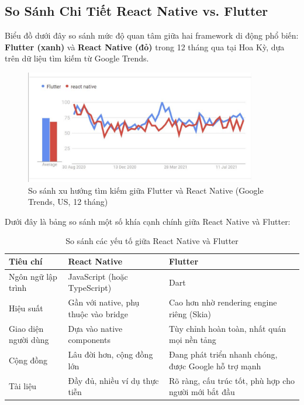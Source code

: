 \subsection{So Sánh Chi Tiết React Native vs. Flutter}
\renewcommand{\labelitemi}{--}    
\begin{flushleft}
    \hspace*{0.8cm}Biểu đồ dưới đây so sánh mức độ quan tâm giữa hai framework di động phổ biến: \textbf{Flutter (xanh)} và \textbf{React Native (đỏ)} trong 12 tháng qua tại Hoa Kỳ, dựa trên dữ liệu tìm kiếm từ Google Trends.

    \begin{figure}[H]
        \centering
        \includegraphics[width=0.9\textwidth]{images/reactNative_flutter.png}
        \caption{So sánh xu hướng tìm kiếm giữa Flutter và React Native (Google Trends, US, 12 tháng)}
    \end{figure}

    \vspace{0.5cm}
    Dưới đây là bảng so sánh một số khía cạnh chính giữa React Native và Flutter:

    \begin{table}[H]
        \centering
        \begin{tabular}{|l|p{6cm}|p{6cm}|}
            \hline
            \textbf{Tiêu chí} & \textbf{React Native} & \textbf{Flutter} \\
            \hline
            Ngôn ngữ lập trình & JavaScript (hoặc TypeScript) & Dart \\
            \hline
            Hiệu suất & Gần với native, phụ thuộc vào bridge & Cao hơn nhờ rendering engine riêng (Skia) \\
            \hline
            Giao diện người dùng & Dựa vào native components & Tùy chỉnh hoàn toàn, nhất quán mọi nền tảng \\
            \hline
            Cộng đồng & Lâu đời hơn, cộng đồng lớn & Đang phát triển nhanh chóng, được Google hỗ trợ mạnh \\
            \hline
            Tài liệu & Đầy đủ, nhiều ví dụ thực tiễn & Rõ ràng, cấu trúc tốt, phù hợp cho người mới bắt đầu \\
            \hline
        \end{tabular}
        \caption{So sánh các yếu tố giữa React Native và Flutter}
    \end{table}
\end{flushleft}

